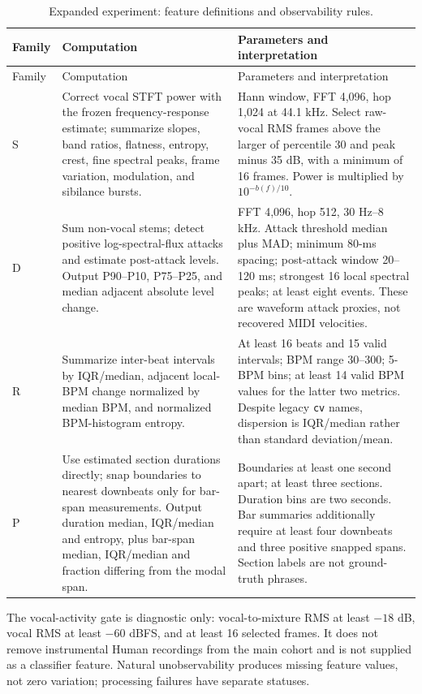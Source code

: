 \begin{longtable}{>{\raggedright\arraybackslash}p{12mm}>{\raggedright\arraybackslash}p{68mm}>{\raggedright\arraybackslash}p{69mm}}
\caption{Expanded experiment: feature definitions and observability rules.}
\label{tab:expanded-feature-rules}\\
\toprule Family & Computation & Parameters and interpretation \\
\midrule
\endfirsthead
\toprule Family & Computation & Parameters and interpretation \\
\midrule
\endhead
S & Correct vocal STFT power with the frozen frequency-response estimate;
summarize slopes, band ratios, flatness, entropy, crest, fine spectral peaks,
frame variation, modulation, and sibilance bursts.
& Hann window, FFT 4,096, hop 1,024 at 44.1 kHz. Select raw-vocal RMS frames above
the larger of percentile 30 and peak minus 35 dB, with a minimum of 16 frames.
Power is multiplied by $10^{-b(f)/10}$. \\
D & Sum non-vocal stems; detect positive log-spectral-flux attacks and estimate
post-attack levels. Output P90--P10, P75--P25, and median adjacent absolute
level change.
& FFT 4,096, hop 512, 30 Hz--8 kHz. Attack threshold median plus MAD; minimum
80-ms spacing; post-attack window 20--120 ms; strongest 16 local spectral peaks;
at least eight events. These are waveform attack proxies, not recovered MIDI
velocities. \\
R & Summarize inter-beat intervals by IQR/median, adjacent local-BPM change
normalized by median BPM, and normalized BPM-histogram entropy.
& At least 16 beats and 15 valid intervals; BPM range 30--300; 5-BPM bins;
at least 14 valid BPM values for the latter two metrics. Despite legacy
\texttt{cv} names, dispersion is IQR/median rather than standard deviation/mean. \\
P & Use estimated section durations directly; snap boundaries to nearest
downbeats only for bar-span measurements.
Output duration median, IQR/median and entropy, plus bar-span median,
IQR/median and fraction differing from the modal span.
& Boundaries at least one second apart; at least three sections. Duration bins
are two seconds. Bar summaries additionally require at least four downbeats
and three positive snapped spans. Section labels are not ground-truth phrases. \\
\bottomrule
\end{longtable}

The vocal-activity gate is diagnostic only: vocal-to-mixture RMS at least
$-18$ dB, vocal RMS at least $-60$ dBFS, and at least 16 selected frames. It does
not remove instrumental Human recordings from the main cohort and is not supplied
as a classifier feature. Natural unobservability produces missing feature values,
not zero variation; processing failures have separate statuses.

